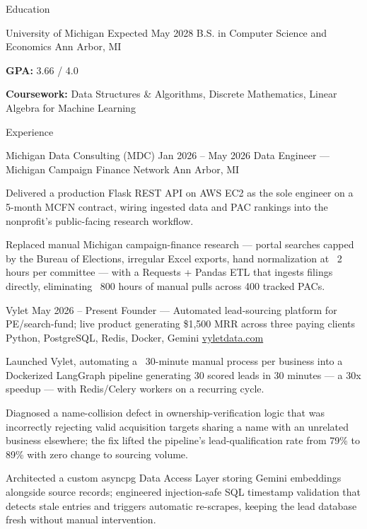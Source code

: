 \documentclass[
	11pt
]{../../../template}
\begin{document}
	\begin{rSection}{E}{ducation}
		\begin{rSectionEntry}
			{University of Michigan}
			{Expected May 2028}
			{B.S. in Computer Science and Economics}
			{}
			{Ann Arbor, MI}

			\item \textbf{GPA:} 3.66 / 4.0
			\item \textbf{Coursework:} Data Structures \& Algorithms, Discrete Mathematics, Linear Algebra for Machine Learning
		\end{rSectionEntry}
	\end{rSection}

	\begin{rSection}{E}{xperience}
		\begin{rSectionEntry}
			{Michigan Data Consulting (MDC)}
			{Jan 2026 -- May 2026}
			{Data Engineer --- Michigan Campaign Finance Network}
			{}
			{Ann Arbor, MI}

			\item Delivered a production Flask REST API on AWS EC2 as the sole engineer on a 5-month MCFN contract, wiring ingested data and PAC rankings into the nonprofit's public-facing research workflow.
			\item Replaced manual Michigan campaign-finance research — portal searches capped by the Bureau of Elections, irregular Excel exports, hand normalization at ~2 hours per committee — with a Requests + Pandas ETL that ingests filings directly, eliminating ~800 hours of manual pulls across 400 tracked PACs.
		\end{rSectionEntry}

		\begin{rSectionEntry}
			{Vylet}
			{May 2026 -- Present}
			{Founder --- Automated lead-sourcing platform for PE/search-fund; live product generating \$1,500 MRR across three paying clients}
			{Python, PostgreSQL, Redis, Docker, Gemini}
			{\href{https://vyletdata.com}{vyletdata.com}}

			\item Launched Vylet, automating a ~30-minute manual process per business into a Dockerized LangGraph pipeline generating 30 scored leads in 30 minutes --- a 30x speedup --- with Redis/Celery workers on a recurring cycle.
			\item Diagnosed a name-collision defect in ownership-verification logic that was incorrectly rejecting valid acquisition targets sharing a name with an unrelated business elsewhere; the fix lifted the pipeline's lead-qualification rate from 79\% to 89\% with zero change to sourcing volume.
			\item Architected a custom asyncpg Data Access Layer storing Gemini embeddings alongside source records; engineered injection-safe SQL timestamp validation that detects stale entries and triggers automatic re-scrapes, keeping the lead database fresh without manual intervention.
		\end{rSectionEntry}


\end{rSection}
\end{document}

